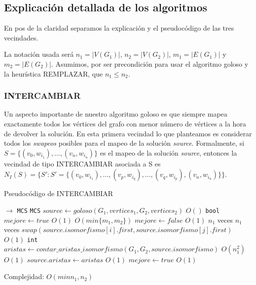 \subsection{Explicación detallada de los algoritmos}
En pos de la claridad separamos la explicación y el pseudocódigo de las tres vecindades. 

La notación usada será $n_1 = |V(G_1)|$, $n_2 = |V(G_2)|$, $m_1 = |E(G_1)|$ y $m_2 = |E(G_2)|$. Asumimos, por ser precondición para usar el algoritmo goloso y la heurística REMPLAZAR, que $n_1 \leq n_2$. 

\subsubsection{INTERCAMBIAR}
Un aspecto importante de nuestro algoritmo goloso es que siempre mapea exactamente todos los vértices del grafo con menor número de vértices a la hora de devolver la solución. En esta primera vecindad lo que planteamos es considerar todos los \emph{swapeos} posibles para el mapeo de la solución \emph{source}. Formalmente, si $S = \{(v_0, w_{i_1}),\hdots , (v_n, w_{i_n})\}$ es el mapeo de la solución \emph{source}, entonces la vecindad de tipo INTERCAMBIAR asociada a S es $N_I(S) = \{S' : S' = \{(v_0, w_{i_1}),\hdots , (v_p, w_{i_q}) , \hdots, (v_q, w_{i_p}), (v_n, w_{i_n})\}\}$.

\begin{algorithm}[H]
  \small
  \begin{algorithmic}[1]
  \caption{Pseudocódigo de INTERCAMBIAR}
  \label{algo:5-1}
    $\rightarrow$ \texttt{MCS}
      \State \texttt{MCS} $source \gets goloso(G_1, vertices_1, G_2, vertices_2)$
      \Comment $O()$
      \State \texttt{bool} $mejore \gets true$
      \Comment $O(1)$
      \Comment $O(min\{m_1, m_2\})$
        \State $mejore \gets false$
        \Comment $O(1)$
        \Comment $n_1$ veces
          \Comment $n_1$ veces
            \State $swap(source.isomorfismo[i].first, source.isomorfismo[j].first)$
            \Comment $O(1)$
            \State \texttt{int} $aristas \gets contar\_aristas\_isomorfismo(G_1, G_2, source.isomorfismo)$
            \Comment $O(n_1^2)$
            \Comment $O(1)$
              \State $source.aristas \gets aristas$ 
              \Comment $O(1)$             
              \State $mejore \gets true$
              \Comment $O(1)$
            \EndIf
          \EndFor
        \EndFor
      \EndWhile
    \EndProcedure
  \end{algorithmic}
  Complejidad: $O(min{n_1, n_2})$
\end{algorithm}

